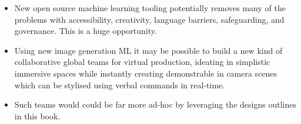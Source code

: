 {\begin{itemize}
\item New open source machine learning tooling potentially removes many of the problems with accessibility, creativity, language barriers, safeguarding, and governance. This is a huge opportunity.
\item Using new image generation ML it may be possible to build a new kind of collaborative global teams for virtual production, ideating in simplistic immersive spaces while instantly creating demonstrable in camera scenes which can be stylised using verbal commands in real-time.
\item Such teams would could be far more ad-hoc by leveraging the designs outlines in this book. 
\end{itemize}
}

